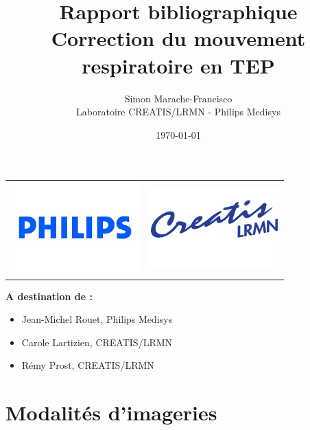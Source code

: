 \documentclass[12pt]{article}
\title{\Huge{Rapport bibliographique}\\\Large{Correction du mouvement respiratoire en TEP}}
\author{
        \vspace{2cm}
        Simon Marache-Francisco \\
        Laboratoire CREATIS/LRMN - Philips Medisys\\
        \vspace{2cm}
}
\date{\today}
\begin{document}
\addtolength{\parskip}{0.5em}

\renewcommand{\cftsecaftersnumb}{\hspace{1em}}
\renewcommand{\cftsubsecaftersnumb}{\hspace{1em}}
\renewcommand{\cftsubsubsecaftersnumb}{\hspace{1em}}


\newcommand{\verrous}{\textbf{Verrous levés}}

\newcommand{\todo}[1]{
\addcontentsline{toc}{subsection}{\textbf{Todo:} #1}
$\|$\textbf{A Faire : }#1$\|$
}


\maketitle
\thispagestyle{empty}

\begin{center}
	\begin{tabular}{c c}
		\includegraphics[width=5cm]{images/logoPhilips} & \includegraphics[width=5cm]{images/logoCREATIS}
	\end{tabular}
\end{center}


\vfill

\textbf{A destination de :}
\begin{itemize}
    \item Jean-Michel Rouet, Philips Medisys
    \item Carole Lartizien, CREATIS/LRMN
    \item Rémy Prost, CREATIS/LRMN
\end{itemize}
\newpage

\tableofcontents

\newpage
\part{Modalités d'imageries}

\end{document}
